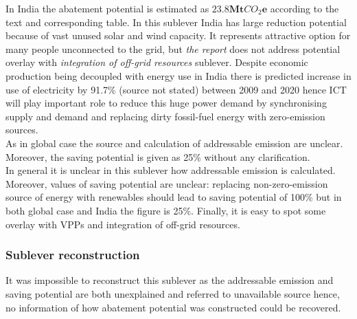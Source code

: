 \documentclass[11pt, twocolumn]{article}
\begin{document}
In India the abatement potential is estimated as $\mathbf{23.8} \mathbf{Mt}CO_2\mathbf{e}$ according to the text and corresponding table. In this sublever India has large reduction potential because of vast unused solar and wind capacity. It represents attractive option for many people unconnected to the grid, but \emph{the report} does not address potential overlay with \emph{integration of off-grid resources} sublever. Despite economic production being decoupled with energy use in India there is predicted increase in use of electricity by 91.7\% (source not stated) between 2009 and 2020 hence ICT will play important role to reduce this huge power demand by synchronising supply and demand and replacing dirty fossil-fuel energy with zero-emission sources.\\
As in global case the source and calculation of addressable emission are unclear. Moreover, the saving potential is given as 25\% without any clarification.\\

In general it is unclear in this sublever how addressable emission is calculated. Moreover, values of saving potential are unclear: replacing non-zero-emission source of energy with renewables should lead to saving potential of 100\% but in both global case and India the figure is 25\%. Finally, it is easy to spot some overlay with VPPs and integration of off-grid resources.\\

\subsubsection{Sublever reconstruction\label{sec:irpg:reconstruction}}
It was impossible to reconstruct this sublever as the addressable emission and saving potential are both unexplained and referred to unavailable source hence, no information of how abatement potential was constructed could be recovered.\\
\end{document}
